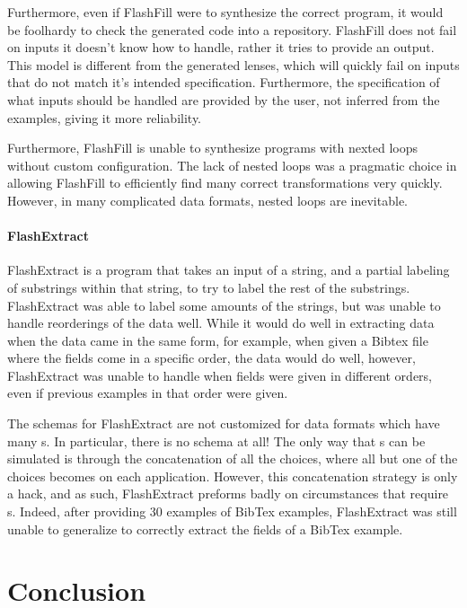 \documentclass[numbers,10pt,preprint\ifanon ,nocopyrightspace\fi]{sigplanconf}
\begin{document}
Furthermore, even if FlashFill were to synthesize the correct program, it would
be foolhardy to check the generated code into a repository.  FlashFill does not
fail on inputs it doesn't know how to handle, rather it tries to provide an
output.  This model is different from the generated lenses, which will quickly
fail on inputs that do not match it's intended specification.  Furthermore, the
specification of what inputs should be handled are provided by the user, not
inferred from the examples, giving it more reliability.

Furthermore, FlashFill is unable to synthesize programs with nexted loops
without custom configuration.  The lack of nested loops was a pragmatic choice
in allowing FlashFill
to efficiently find many correct transformations very quickly.  However, in
many complicated data formats, nested loops are inevitable. 

\paragraph*{FlashExtract}
FlashExtract is a program that takes an input of a string, and a partial
labeling of substrings within that string, to try to label the rest of the
substrings.  FlashExtract was able to label some amounts of the strings, but was
unable to handle reorderings of the data well.  While it would do well in
extracting data when the data came in the same form, for example, when given a
Bibtex file where the fields come in a specific order, the data would do well,
however, FlashExtract was unable to handle when fields were given in different
orders, even if previous examples in that order were given.

The schemas for FlashExtract are not customized for data formats which have many
\OrRegexType{}s.  In particular, there is no \OrRegexType{} schema at all!  The
only way that \OrRegexType{}s can be simulated is through the concatenation of
all the choices, where all but one of the choices becomes  on each
application.  However, this concatenation strategy is only a hack, and as such,
FlashExtract preforms badly on
circumstances that require \OrRegexType{}s.
Indeed, after providing 30 examples of BibTex
examples, FlashExtract was still unable to generalize to correctly extract
the fields of a BibTex example.

\section{Conclusion}
\end{document}
